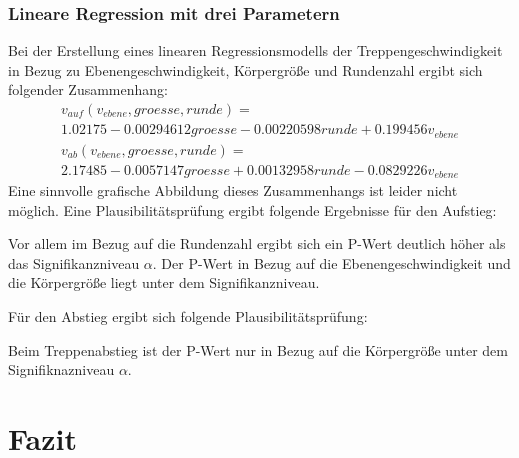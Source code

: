 \subsubsection{Lineare Regression mit drei Parametern}
Bei der Erstellung eines linearen Regressionsmodells der Treppengeschwindigkeit in Bezug zu Ebenengeschwindigkeit, Körpergröße und Rundenzahl ergibt sich folgender Zusammenhang:
\begin{multline}
v_{auf}(v_{ebene}, groesse, runde) = \\ 
1.02175 -0.00294612 groesse -0.00220598 runde +0.199456 v_{ebene}
\end{multline}
\begin{multline}
v_{ab}(v_{ebene}, groesse, runde ) = \\ 
2.17485 -0.0057147 groesse+0.00132958 runde -0.0829226 v_{ebene}
\end{multline}
Eine sinnvolle grafische Abbildung dieses Zusammenhangs ist leider nicht möglich. 
Eine Plausibilitätsprüfung ergibt folgende Ergebnisse für den Aufstieg:

Vor allem im Bezug auf die Rundenzahl ergibt sich ein P-Wert deutlich höher als das Signifikanzniveau $\alpha$. Der P-Wert in Bezug auf die Ebenengeschwindigkeit und die Körpergröße liegt unter dem Signifikanzniveau.


Für den Abstieg ergibt sich folgende Plausibilitätsprüfung:

Beim Treppenabstieg ist der P-Wert nur in Bezug auf die Körpergröße unter dem Signifiknazniveau $\alpha$.
















\section{Fazit}


